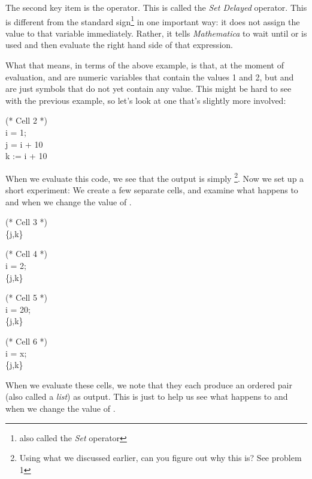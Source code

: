 The second key item is the \expr{:=} operator. This is called the \emph{Set Delayed} operator. This is different from the standard \expr{=} sign\footnote{also called the \emph{Set} operator} in one important way: it does not assign the value to that variable immediately. Rather, it tells \emph{Mathematica} to wait until  or  is used and then evaluate the right hand side of that expression. 

What that means, in terms of the above example, is that, at the moment of evaluation,  and  are numeric variables that contain the values 1 and 2, but  and  are just symbols that do not yet contain any value. This might be hard to see with the previous example, so let's look at one that's slightly more involved:

\begin{code}
	   (* Cell 2 *)\\
	   i = 1;\\
	   j = i + 10\\
	   k := i + 10
\end{code}

When we evaluate this code, we see that the output is simply \footnote{Using what we discussed earlier, can you figure out why this is? See problem 1}. Now we set up a short experiment: We create a few separate cells, and examine what happens to  and  when we change the value of .

\begin{code}
	   (* Cell 3 *)\\
	   \{j,k\}
\end{code}

\begin{code}
	   (* Cell 4 *)\\
	   i = 2;\\
	   \{j,k\}
\end{code}

\begin{code}
	   (* Cell 5 *)\\
	   i = 20;\\
	   \{j,k\}
\end{code}

\begin{code}
	   (* Cell 6 *)\\
	   i = x;\\
	   \{j,k\}
\end{code}

When we evaluate these cells, we note that they each produce an ordered pair (also called a \emph{list}) as output. This is just to help us see what happens to  and  when we change the value of .

